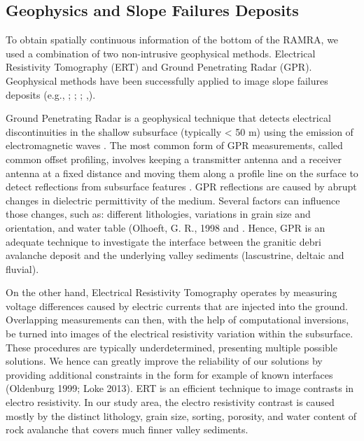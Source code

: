 \documentclass[5p]{elsarticle}
\begin{document}


\bigskip

                 
                 
\subsection{Geophysics and Slope Failures Deposits}

To obtain spatially continuous information of the bottom of the RAMRA, we used a combination of two non-intrusive geophysical methods. Electrical Resistivity Tomography (ERT) and Ground Penetrating Radar (GPR). Geophysical methods have been successfully applied to image slope failures deposits (e.g., \cite{sass2006determination}; \cite{otto2006comparing}; \cite{socco2010geophysical}; \cite{brody2015near},\cite{liu2018near}).
                 
Ground Penetrating Radar is a geophysical technique that detects electrical discontinuities in the shallow subsurface (typically < 50 m) using the emission of electromagnetic waves \citep{neal2004ground}. The most common form of GPR measurements, called common offset profiling, involves keeping a transmitter antenna and a receiver antenna at a fixed distance and moving them along a profile line on the surface to detect reflections from subsurface features \citep{jol2008ground}. GPR reflections are caused by abrupt changes in dielectric permittivity of the medium. Several factors can influence those changes, such as: different lithologies, variations in grain size and orientation, and water table (Olhoeft, G. R., 1998 and \citep{neal2004ground}. Hence, GPR is an adequate technique to investigate the interface between the  granitic debri avalanche deposit and the underlying  valley sediments (lascustrine, deltaic and fluvial).   

On the other hand, Electrical Resistivity Tomography operates by measuring voltage differences caused by electric currents that are injected into the ground. Overlapping measurements can then, with the help of computational inversions, be turned into images of the electrical resistivity variation within the subsurface. These procedures are typically underdetermined, presenting multiple possible solutions. We hence can greatly improve the reliability of our solutions by providing additional constraints in the form for example of known interfaces (Oldenburg 1999; Loke 2013). ERT is an efficient technique to image contrasts in electro resistivity. In our study area, the electro resistivity contrast is caused mostly by the distinct  lithology, grain size, sorting, porosity, and water content  of rock avalanche that covers much finner valley sediments. 
\end{document}
